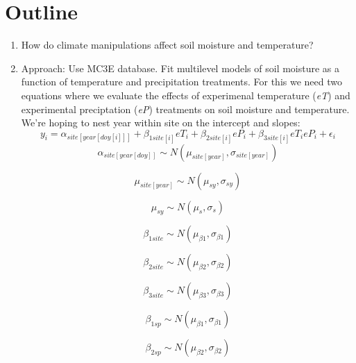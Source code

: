 \documentclass{article}
\begin{document}
\section*{Outline}
\begin{enumerate}
\item{How do climate manipulations affect soil moisture and temperature?}
\item{Approach: Use MC3E database. Fit multilevel models of soil moisture as a function of temperature and precipitation treatments.}
\noindent For this we need two equations where we evaluate the effects of experimenal temperature (\textit{eT}) and experimental preciptation (\textit{eP}) treatments on soil moisture and temperature. We're hoping to nest year within site on the intercept and slopes:
\begin{equation}
y_{i}=\alpha_{site[year[doy[i]]]}+ \beta_{1 site[i]}eT_i+\beta_{2 site[i]}eP_i+\beta_{3 site[i]}eT_ieP_i+\epsilon_{i}
\end{equation}
\begin{equation}
\alpha_{site[year[doy]]}\sim N(\mu_{site[year]}, \sigma_{site[year]})
\end{equation}

\begin{equation}
\mu_{site[year]} \sim N(\mu_{sy}, \sigma_{sy})
\end{equation}

\begin{equation}
\mu_{sy} \sim N(\mu_{s}, \sigma_{s})
\end{equation}

\begin{equation}
\beta_{1 site} \sim N(\mu_{\beta1}, \sigma_{\beta1})
\end{equation}

\begin{equation}
\beta_{2 site} \sim N(\mu_{\beta2}, \sigma_{\beta2})
\end{equation}

\begin{equation}
\beta_{3 site} \sim N(\mu_{\beta3}, \sigma_{\beta3})
\end{equation}

\begin{equation}
\beta_{1 sp} \sim N(\mu_{\beta1}, \sigma_{\beta1})
\end{equation}

\begin{equation}
\beta_{2 sp} \sim N(\mu_{\beta2}, \sigma_{\beta2})
\end{equation}


\end{enumerate}
\end{document}
